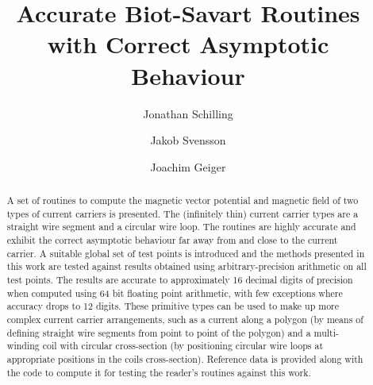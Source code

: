 \documentclass[preprint,12pt]{elsarticle}
\begin{document}
\begin{frontmatter}



\title{Accurate Biot-Savart Routines with Correct Asymptotic Behaviour}


\author[a]{Jonathan Schilling}
\author[b]{Jakob Svensson}
\author[b]{Joachim Geiger}

\address[a]{Max Planck Institute for Plasma Physics, Wendelsteinstrasse 1, 17489 Greifswald, Germany}

\begin{abstract}
A set of routines to compute the magnetic vector potential and magnetic field of two types of current carriers is presented.
The (infinitely thin) current carrier types are a straight wire segment and a circular wire loop.
The routines are highly accurate and exhibit the correct asymptotic behaviour far away from and close to the current carrier.
A suitable global set of test points is introduced and the methods presented in this work
are tested against results obtained using arbitrary-precision arithmetic on all test points.
The results are accurate to approximately 16 decimal digits of precision when computed using 64 bit floating point arithmetic,
with few exceptions where accuracy drops to 12 digits.
These primitive types can be used to make up more complex current carrier arrangements,
such as a current along a polygon (by means of defining straight wire segments from point to point of the polygon)
and a multi-winding coil with circular cross-section (by positioning circular wire loops at appropriate positions in the coils cross-section).
Reference data is provided along with the code to compute it
for testing the reader's routines against this work.
\end{abstract}


\end{frontmatter}
\end{document}
